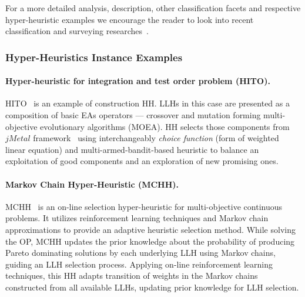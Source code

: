
	


For a more detailed analysis, description, other classification facets and respective hyper-heuristic examples we encourage the reader to look into recent classification and surveying researches~\cite{burke2003hyper,ryser2014review,drake2019recent,burke2019classification}.

\subsubsection{Hyper-Heuristics Instance Examples}\label{bg: hh examples}
\paragraph{Hyper-heuristic for integration and test order problem (HITO).} HITO~\cite{guizzo2015hyper} is an example of construction HH. LLHs in this case are presented as a composition of basic EAs operators — crossover and mutation forming multi-objective evolutionary algorithms (MOEA). HH selects those components from $jMetal$ framework~\cite{durillo2011jmetal} using interchangeably \emph{choice function} (form of weighted linear equation) and multi-armed-bandit-based heuristic to balance an exploitation of good components and an exploration of new promising ones.


\paragraph{Markov Chain Hyper-Heuristic (MCHH).} MCHH~\cite{mcclymont2011markov} is an on-line selection hyper-heuristic for multi-objective continuous problems. It utilizes reinforcement learning techniques and Markov chain approximations to provide an adaptive heuristic selection method. While solving the OP, MCHH updates the prior knowledge about the probability of producing Pareto dominating solutions by each underlying LLH using Markov chains, guiding an LLH selection process. Applying on-line reinforcement learning techniques, this HH adapts transition of weights in the Markov chains constructed from all available LLHs, updating prior knowledge for LLH selection.


